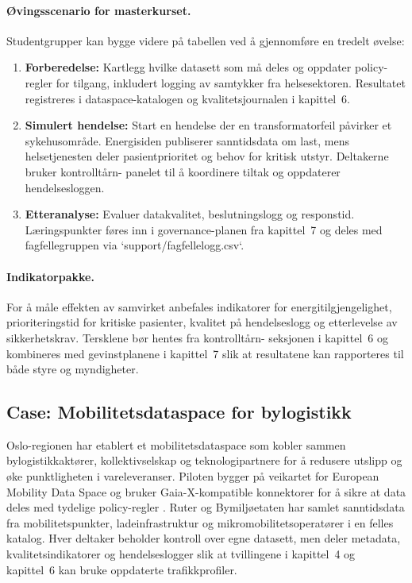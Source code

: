 \paragraph{Øvingsscenario for masterkurset.} Studentgrupper kan bygge videre på tabellen ved å gjennomføre en tredelt øvelse:
\begin{enumerate}
    \item \textbf{Forberedelse:} Kartlegg hvilke datasett som må deles og oppdater policy-regler for tilgang, inkludert logging av
    samtykker fra helsesektoren. Resultatet registreres i dataspace-katalogen og kvalitetsjournalen i kapittel~6.
    \item \textbf{Simulert hendelse:} Start en hendelse der en transformatorfeil påvirker et sykehusområde. Energisiden publiserer
    sanntidsdata om last, mens helsetjenesten deler pasientprioritet og behov for kritisk utstyr. Deltakerne bruker kontrolltårn-
    panelet til å koordinere tiltak og oppdaterer hendelsesloggen.
    \item \textbf{Etteranalyse:} Evaluer datakvalitet, beslutningslogg og responstid. Læringspunkter føres inn i governance-planen
    fra kapittel~7 og deles med fagfellegruppen via `support/fagfellelogg.csv`.
\end{enumerate}

\paragraph{Indikatorpakke.} For å måle effekten av samvirket anbefales indikatorer for energitilgjengelighet, prioriteringstid
for kritiske pasienter, kvalitet på hendelseslogg og etterlevelse av sikkerhetskrav. Tersklene bør hentes fra kontrolltårn-
seksjonen i kapittel~6 og kombineres med gevinstplanene i kapittel~7 slik at resultatene kan rapporteres til både styre og
myndigheter.

\subsection{Case: Mobilitetsdataspace for bylogistikk}
Oslo-regionen har etablert et mobilitetsdataspace som kobler sammen bylogistikkaktører, kollektivselskap og teknologipartnere
for å redusere utslipp og øke punktligheten i vareleveranser. Piloten bygger på veikartet for European Mobility Data Space og
bruker Gaia-X-kompatible konnektorer for å sikre at data deles med tydelige policy-regler \citep{ec2023mobilitydataspaceblueprint}.
Ruter og Bymiljøetaten har samlet sanntidsdata fra mobilitetspunkter, ladeinfrastruktur og mikromobilitetsoperatører i en
felles katalog. Hver deltaker beholder kontroll over egne datasett, men deler metadata, kvalitetsindikatorer og hendelseslogger
slik at tvillingene i kapittel~4 og kapittel~6 kan bruke oppdaterte trafikkprofiler.

